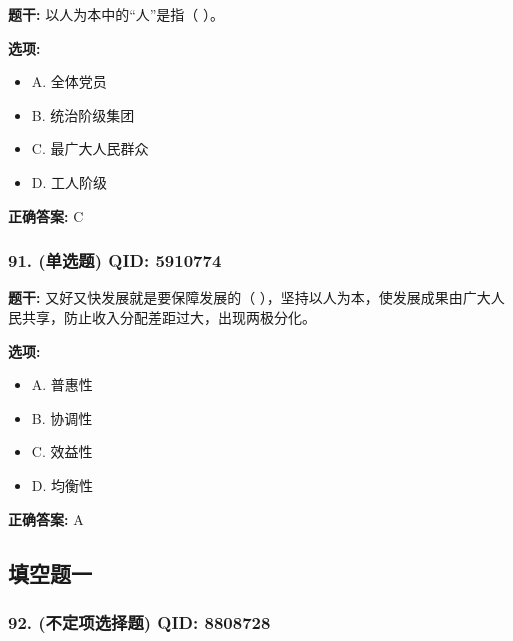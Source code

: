 \documentclass[12pt,UTF8]{ctexart}
\begin{document}
\textbf{题干:}
以人为本中的“人”是指（ ）。

\textbf{选项:}
\begin{itemize}[leftmargin=*]

  \item A. 全体党员

  \item B. 统治阶级集团

  \item C. 最广大人民群众

  \item D. 工人阶级

\end{itemize}

\textbf{正确答案:}
C

\vspace{0.3em}\hrulefill\vspace{0.7em}

\subsubsection*{91. (单选题) \small QID: 5910774}

\textbf{题干:}
又好又快发展就是要保障发展的（ ），坚持以人为本，使发展成果由广大人民共享，防止收入分配差距过大，出现两极分化。

\textbf{选项:}
\begin{itemize}[leftmargin=*]

  \item A. 普惠性

  \item B. 协调性

  \item C. 效益性

  \item D. 均衡性

\end{itemize}

\textbf{正确答案:}
A

\vspace{0.3em}\hrulefill\vspace{0.7em}

\subsection*{填空题一}

\subsubsection*{92. (不定项选择题) \small QID: 8808728}
\end{document}

